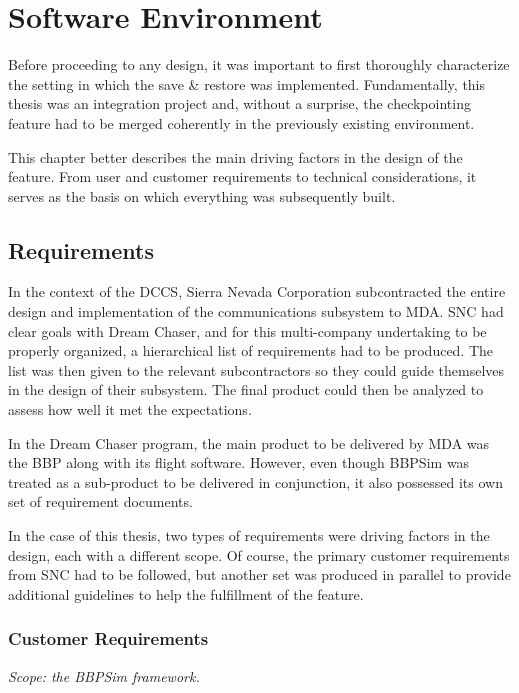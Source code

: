 {
\setlength{\parindent}{2em}
\chapter{Software Environment}\label{cha:sim-env}
Before proceeding to any design, it was important to first thoroughly characterize the setting in which the save \& restore was implemented. Fundamentally, this thesis was an integration project and, without a surprise, the checkpointing feature had to be merged coherently in the previously existing environment.

This chapter better describes the main driving factors in the design of the feature. From user and customer requirements to technical considerations, it serves as the basis on which everything was subsequently built.

\section{Requirements}
In the context of the \gls{DCCS}, Sierra Nevada Corporation subcontracted the entire design and implementation of the communications subsystem to \gls{MDA}. \gls{SNC} had clear goals with Dream Chaser, and for this multi-company undertaking to be properly organized, a hierarchical list of requirements had to be produced. The list was then given to the relevant subcontractors so they could guide themselves in the design of their subsystem. The final product could then be analyzed to assess how well it met the expectations. 

In the Dream Chaser program, the main product to be delivered by \gls{MDA} was the \gls{BBP} along with its flight software. However, even though \gls{BBPSim} was treated as a sub-product to be delivered in conjunction, it also possessed its own set of requirement documents.

In the case of this thesis, two types of requirements were driving factors in the design, each with a different scope. Of course, the primary customer requirements from \gls{SNC} had to be followed, but another set was produced in parallel to provide additional guidelines to help the fulfillment of the feature.  

\subsection*{Customer Requirements}
\textit{Scope: the {BBPSim} framework.}

}
